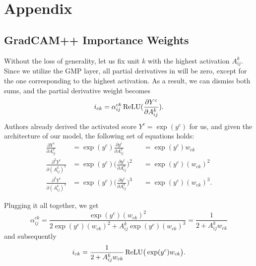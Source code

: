 {}

\renewcommand{\thechapter}{A}
\chapter{Appendix}

\section{GradCAM++ Importance Weights}\label{sec:grad-cam-plus-plus-weight-derivation}

Without the loss of generality, let us fix unit $k$ with the highest activation $A^k_{ij}$.
Since we utilize the GMP layer, all partial derivatives in  will be zero, except for the one corresponding to the highest activation.
As a result, we can dismiss both sums, and the partial derivative weight becomes 
\begin{equation}
    i_{ck} = \alpha^{ck}_{ij} \operatorname{ReLU}(\frac{\partial Y^c}{\partial A^k_{ij}}).
\end{equation}
Authors already derived the activated score $Y^c = \exp(y^c)$ for us, and given the architecture of our model, the following set of equations holds:
\begin{equation}
\begin{aligned}
  \frac{\partial Y^c}{\partial A_{ij}^k}       &= \exp(y^c) \frac{\partial y^c}{\partial A_{ij}^k}     &&= \exp(y^c) w_{ck}     \\
  \frac{\partial^2 Y^c}{\partial (A_{ij}^k)^2} &= \exp(y^c) \bigl(\frac{\partial y^c}{\partial A_{ij}^k}\bigr)^2 &&= \exp(y^c) (w_{ck})^2 \\
  \frac{\partial^3 Y^c}{\partial (A_{ij}^k)^3} &= \exp(y^c) \bigl(\frac{\partial y^c}{\partial A_{ij}^k}\bigr)^3 &&= \exp(y^c) (w_{ck})^3.
\end{aligned}
\end{equation}

Plugging it all together, we get 
\begin{equation}
    \alpha_{ij}^{ck} = \frac{\exp(y^c) (w_{ck})^2}{2 \exp(y^c) (w_{ck})^2 + A^k_{ij} \exp(y^c) (w_{ck})^3} = \frac{1}{2 + A^k_{ij}w_{ck}}
\end{equation}
and subsequently
\begin{equation}
    i_{ck} = \frac{1}{2 + A^k_{ij}w_{ck}} \operatorname{ReLU}\bigr(\exp(y^c)w_{ck}\bigl).
\end{equation}

